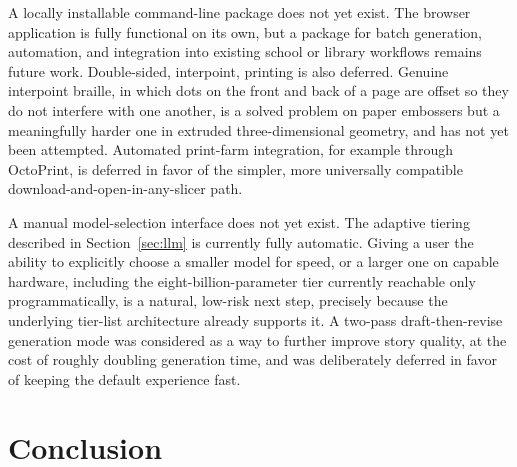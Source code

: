 \documentclass[conference]{IEEEtran}
\begin{document}
A locally installable command-line package does not yet exist. The browser application is fully functional on its own, but a package for batch generation, automation, and integration into existing school or library workflows remains future work. Double-sided, interpoint, printing is also deferred. Genuine interpoint braille, in which dots on the front and back of a page are offset so they do not interfere with one another, is a solved problem on paper embossers but a meaningfully harder one in extruded three-dimensional geometry, and has not yet been attempted. Automated print-farm integration, for example through OctoPrint, is deferred in favor of the simpler, more universally compatible download-and-open-in-any-slicer path.

A manual model-selection interface does not yet exist. The adaptive tiering described in Section~\ref{sec:llm} is currently fully automatic. Giving a user the ability to explicitly choose a smaller model for speed, or a larger one on capable hardware, including the eight-billion-parameter tier currently reachable only programmatically, is a natural, low-risk next step, precisely because the underlying tier-list architecture already supports it. A two-pass draft-then-revise generation mode was considered as a way to further improve story quality, at the cost of roughly doubling generation time, and was deliberately deferred in favor of keeping the default experience fast.

\section{Conclusion}\label{sec:conclusion}
\end{document}
